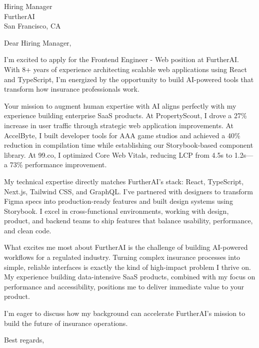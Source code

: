 \documentclass[11pt]{letter}
\begin{document}
\begin{letter}{%
Hiring Manager \\
FurtherAI \\
San Francisco, CA
}

\opening{Dear Hiring Manager,}

I'm excited to apply for the Frontend Engineer - Web position at FurtherAI. With 8+ years of experience architecting scalable web applications using React and TypeScript, I'm energized by the opportunity to build AI-powered tools that transform how insurance professionals work.

Your mission to augment human expertise with AI aligns perfectly with my experience building enterprise SaaS products. At PropertyScout, I drove a 27\% increase in user traffic through strategic web application improvements. At AccelByte, I built developer tools for AAA game studios and achieved a 40\% reduction in compilation time while establishing our Storybook-based component library. At 99.co, I optimized Core Web Vitals, reducing LCP from 4.5s to 1.2s---a 73\% performance improvement.

My technical expertise directly matches FurtherAI's stack: React, TypeScript, Next.js, Tailwind CSS, and GraphQL. I've partnered with designers to transform Figma specs into production-ready features and built design systems using Storybook. I excel in cross-functional environments, working with design, product, and backend teams to ship features that balance usability, performance, and clean code.

What excites me most about FurtherAI is the challenge of building AI-powered workflows for a regulated industry. Turning complex insurance processes into simple, reliable interfaces is exactly the kind of high-impact problem I thrive on. My experience building data-intensive SaaS products, combined with my focus on performance and accessibility, positions me to deliver immediate value to your product.

I'm eager to discuss how my background can accelerate FurtherAI's mission to build the future of insurance operations.

\closing{Best regards,}

\end{letter}
\end{document}
